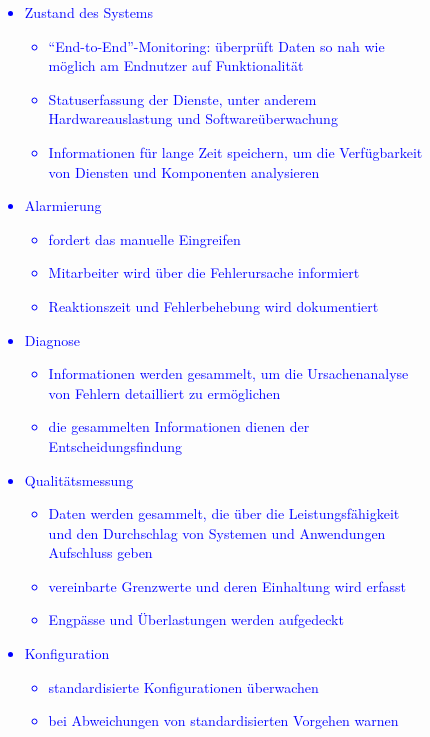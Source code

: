 \begin{figure}[!h]
    \textcolor{blue}{
        \begin{itemize}[noitemsep]
            \item Zustand des Systems
            \begin{itemize}
                \item \enquote{End-to-End}-Monitoring: überprüft Daten so nah wie möglich am Endnutzer auf Funktionalität
                \item Statuserfassung der Dienste, unter anderem Hardwareauslastung und Softwareüberwachung
                \item Informationen für lange Zeit speichern, um die Verfügbarkeit von Diensten und Komponenten analysieren
            \end{itemize}
            \item Alarmierung
            \begin{itemize}
                \item fordert das manuelle Eingreifen
                \item Mitarbeiter wird über die Fehlerursache informiert
                \item Reaktionszeit und Fehlerbehebung wird dokumentiert
            \end{itemize}
            \item Diagnose
            \begin{itemize}
                \item Informationen werden gesammelt, um die Ursachenanalyse von Fehlern detailliert zu ermöglichen
                \item die gesammelten Informationen dienen der Entscheidungsfindung
            \end{itemize}
            \item Qualitätsmessung
            \begin{itemize}
                \item Daten werden gesammelt, die über die Leistungsfähigkeit und den Durchschlag von Systemen und Anwendungen Aufschluss geben
                \item vereinbarte Grenzwerte und deren Einhaltung wird erfasst
                \item Engpässe und Überlastungen werden aufgedeckt
            \end{itemize}
            \item Konfiguration
            \begin{itemize}
                \item standardisierte Konfigurationen überwachen
                \item bei Abweichungen von standardisierten Vorgehen warnen \autocite{cloudradar}
            \end{itemize}
        \end{itemize}\label{fig:figure5}}
\end{figure}


